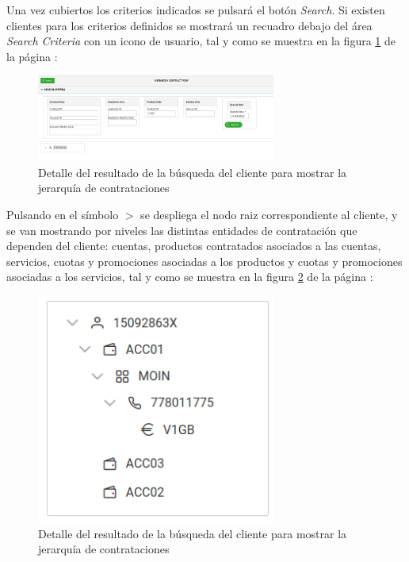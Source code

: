 Una vez cubiertos los criterios indicados se pulsará el botón \emph{Search}. Si existen clientes para los criterios definidos se mostrará un recuadro debajo del área \emph{Search Criteria} con un icono de usuario, tal y como se muestra en la figura \ref{fig:vista-jerarquia-01} de la página \pageref{fig:vista-jerarquia-01}:

\begin{figure}[H]
  \centering
  \includegraphics[width=0.70\textwidth]{imaxes/vista-jerarquia-01.png}
  \caption{Detalle del resultado de la búsqueda del cliente para mostrar la jerarquía de contrataciones}
  \label{fig:vista-jerarquia-01}
\end{figure}

Pulsando en el símbolo \large{$>$} se despliega el nodo raiz correspondiente al cliente, y se van mostrando por niveles las distintas entidades de contratación que dependen del cliente: cuentas, productos contratados asociados a las cuentas, servicios, cuotas y promociones asociadas a los productos y cuotas y promociones asociadas a los servicios,  tal y como se muestra en la figura \ref{fig:vista-jerarquia-desplegada} de la página \pageref{fig:vista-jerarquia-desplegada}:


\begin{figure}[H]
  \centering
  \includegraphics[width=0.70\textwidth]{imaxes/vista-jerarquia-desplegada.png}
  \caption{Detalle del resultado de la búsqueda del cliente para mostrar la jerarquía de contrataciones}
  \label{fig:vista-jerarquia-desplegada}
\end{figure}


